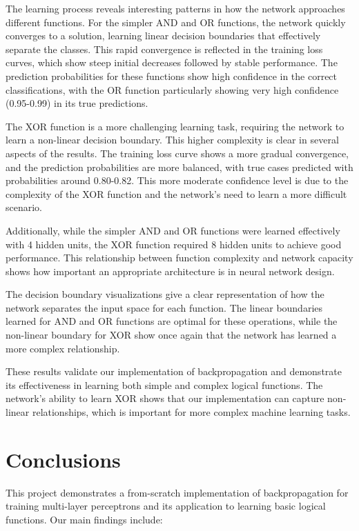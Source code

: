 \documentclass[11pt,a4paper]{article}
\begin{document}
The learning process reveals interesting patterns in how the network approaches different functions. For the simpler AND and OR functions, the network quickly converges to a solution, learning linear decision boundaries that effectively separate the classes. This rapid convergence is reflected in the training loss curves, which show steep initial decreases followed by stable performance. The prediction probabilities for these functions show high confidence in the correct classifications, with the OR function particularly showing very high confidence (0.95-0.99) in its true predictions.

The XOR function is a more challenging learning task, requiring the network to learn a non-linear decision boundary. This higher complexity is clear in several aspects of the results. The training loss curve shows a more gradual convergence, and the prediction probabilities are more balanced, with true cases predicted with probabilities around 0.80-0.82. This more moderate confidence level is due to the complexity of the XOR function and the network's need to learn a more difficult scenario.

Additionally, while the simpler AND and OR functions were learned effectively with 4 hidden units, the XOR function required 8 hidden units to achieve good performance. This relationship between function complexity and network capacity shows how important an appropriate architecture is in neural network design.

The decision boundary visualizations give a clear representation of how the network separates the input space for each function. The linear boundaries learned for AND and OR functions are optimal for these operations, while the non-linear boundary for XOR show once again that the network has learned a more complex relationship.

These results validate our implementation of backpropagation and demonstrate its effectiveness in learning both simple and complex logical functions. The network's ability to learn XOR shows that our implementation can capture non-linear relationships, which is important for more complex machine learning tasks.

\section{Conclusions}
\label{sec:conclusions}
This project demonstrates a from-scratch implementation of backpropagation for training multi-layer perceptrons and its application to learning basic logical functions. Our main findings include:
\end{document}
